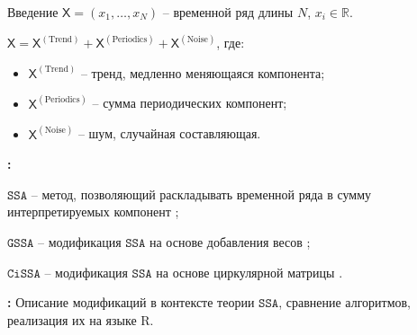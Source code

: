 \documentclass[notheorems, handout]{beamer}
\theoremstyle{definition}
\newcommand{\SSA}{\texttt{SSA}}
\newcommand{\GSSA}{\texttt{GSSA}}
\newcommand{\CISSA}{\texttt{CiSSA}}
\newcommand{\TS}{\mathsf{X}}
\begin{document}
\begin{frame}{Введение}
	$\TS = (x_1, \dots, x_{N})$ -- временной ряд длины \( N \), \( x_i \in \mathbb{R} \).

	\(\TS = \TS^{(\text{Trend})} + \TS^{(\text{Periodics})} + \TS^{(\text{Noise})}\), где:
	\begin{itemize}
		\item \( \TS^{(\text{Trend})} \) -- тренд, медленно меняющаяся компонента;
		\item \( \TS^{(\text{Periodics})} \) -- сумма периодических компонент;
		\item \( \TS^{(\text{Noise})} \) -- шум, случайная составляющая.
	\end{itemize}

	\textbf{:}

	$\SSA$ -- метод, позволяющий раскладывать временной ряда в сумму интерпретируемых компонент \parencite{golyandina2001analysis};

	$\GSSA$ -- модификация $\SSA$ на основе добавления весов \parencite{gu2024generalized};

	$\CISSA$ -- модификация $\SSA$ на основе циркулярной матрицы \parencite{bogalo2020}.

	\textbf{:}
	Описание модификаций в контексте теории $\SSA$, сравнение алгоритмов, реализация их на языке R.

\end{frame}







\end{document}
